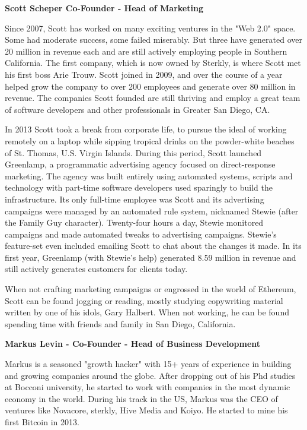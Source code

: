 \documentclass{article}
\begin{document}
\begin {framed}
\begin {center}
\textbf{Scott Scheper Co-Founder - Head of Marketing}\par
\end {center}
Since 2007, Scott has worked on many exciting ventures in the "Web 2.0" space. Some had moderate success, some failed miserably. But three have generated over 20 million in revenue each and are still actively employing people in Southern California. The first company, which is now owned by Sterkly, is where Scott met his first boss Arie Trouw. Scott joined in 2009, and over the course of a year helped grow the company to over 200 employees and generate over 80 million in revenue. The companies Scott founded are still thriving and employ a great team of software developers and other professionals in Greater San Diego, CA.

In 2013 Scott took a break from corporate life, to pursue the ideal of working remotely on a laptop while sipping tropical drinks on the powder-white beaches of St. Thomas, U.S. Virgin Islands. During this period, Scott launched Greenlamp, a programmatic advertising agency focused on direct-response marketing. The agency was built entirely using automated systems, scripts and technology with part-time software developers used sparingly to build the infrastructure. Its only full-time employee was Scott and its advertising campaigns were managed by an automated rule system, nicknamed Stewie (after the Family Guy character). Twenty-four hours a day, Stewie monitored campaigns and made automated tweaks to advertising campaigns. Stewie's feature-set even included emailing Scott to chat about the changes it made.  In its first year, Greenlamp (with Stewie's help) generated 8.59 million in revenue and still actively generates customers for clients today. 

When not crafting marketing campaigns or engrossed in the world of Ethereum, Scott can be found jogging or reading, mostly studying copywriting material written by one of his idols, Gary Halbert. When not working, he can be found spending time with friends and family in San Diego, California.
\end {framed}

\begin {framed}
\begin {center}
\textbf{Markus Levin - Co-Founder - Head of Business Development}\par
\end {center}
Markus is a seasoned "growth hacker" with 15+ years of experience in building and growing companies around the globe. After dropping out of his Phd studies at Bocconi university, he started to work with companies in the most dynamic economy in the world. During his track in the US, Markus was the CEO of ventures like Novacore, sterkly, Hive Media and Koiyo. He started to mine his first Bitcoin in 2013.
\end {framed}
\end{document}
